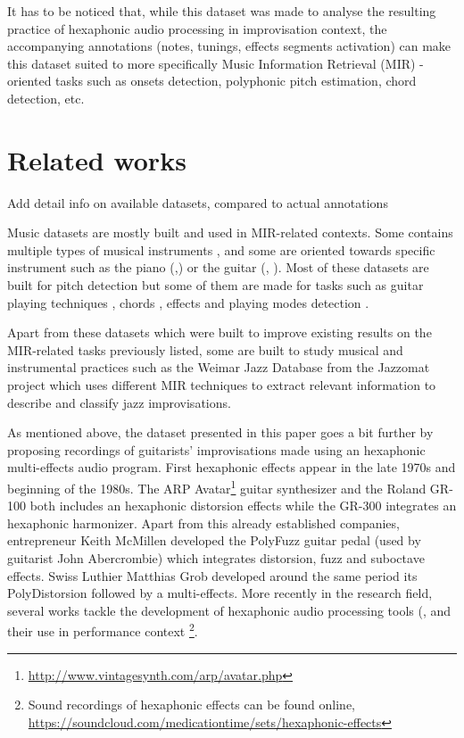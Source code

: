 \documentclass{article}
\begin{document}
It has to be noticed that, while this dataset was made to analyse the resulting practice of hexaphonic audio processing in improvisation context, the accompanying annotations (notes, tunings, effects segments activation) can make this dataset suited to more specifically Music Information Retrieval (MIR) -oriented tasks such as onsets detection, polyphonic pitch estimation, chord detection, etc.

\section{Related works}

Add detail info on available datasets, compared to actual annotations

Music datasets are mostly built and used in MIR-related contexts.  Some contains multiple types of musical instruments \cite{thickstun2017learning}, and some are oriented towards specific instrument such as the piano (\cite{Emiya2010MAPS},\cite{hawthorne2018enabling}) or the guitar (\cite{Kehling2014}, \cite{Author:Xi2018}). Most of these datasets are built for pitch detection but some of them are made for tasks such as guitar playing techniques \cite{Author:Su2014a}, chords \cite{nadar2019Chords}, effects \cite{Stein2010} and playing modes detection \cite{Foulon2014}. 

Apart from these datasets which were built to improve existing results on the MIR-related tasks previously listed, some are built to study musical and instrumental practices such as the Weimar Jazz Database\cite{Pfleiderer:2017:BOOK} from the Jazzomat project\cite{Frieler:2013:Jazzomat} which uses different MIR techniques to extract relevant information to describe and classify jazz improvisations. 

As mentioned above, the dataset presented in this paper goes a bit further by proposing recordings of guitarists' improvisations made using an hexaphonic multi-effects audio program. First hexaphonic effects appear in the late 1970s and beginning of the 1980s. The ARP Avatar\footnote{\url{http://www.vintagesynth.com/arp/avatar.php}} guitar synthesizer and the Roland GR-100\cite{joness-gr100} both includes an hexaphonic distorsion effects while the GR-300\cite{joness-gr300} integrates an hexaphonic harmonizer. Apart from this already established companies, entrepreneur Keith McMillen developed the PolyFuzz\cite{McMillen2015-timeline} guitar pedal (used by guitarist John Abercrombie) which integrates distorsion, fuzz and suboctave effects. Swiss Luthier Matthias Grob developed around the same period its PolyDistorsion \cite{grob:paradisGuitar} followed by a  multi-effects.
More recently in the research field, several works tackle the development of hexaphonic audio processing tools (\cite{sci:Puckette2007}, \cite{sci:Reboursiere2010} and their use in performance context \cite{Reboursiere2020_Puzzle_eng}\footnote{Sound recordings of hexaphonic effects can be found online, \href{https://soundcloud.com/medicationtime/sets/hexaphonic-effects}{https://soundcloud.com/medicationtime/sets/hexaphonic-effects}}.
\end{document}
